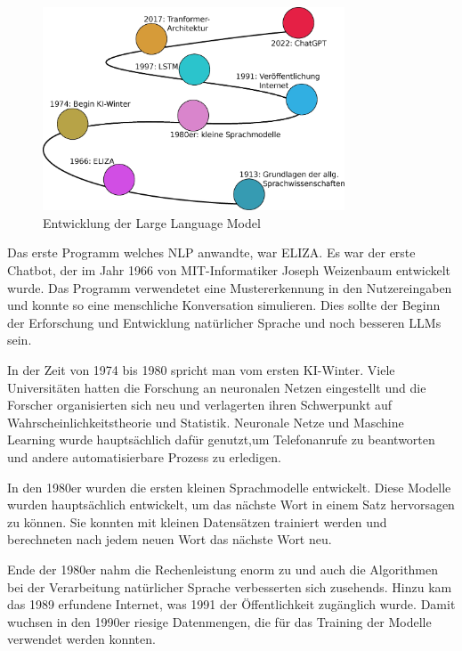 \begin{center}
	\begin{figure}[!ht]
		\includegraphics[width=0.8\textwidth]{content/chapter_basics/images/evolution_of_llm.eps}
		\centering
		\caption{Entwicklung der Large Language Model}
		\label{img:evolotion_of_llm}
	\end{figure}
\end{center}

Das erste Programm welches \acrshort{NLP} anwandte, war ELIZA. Es war der erste Chatbot, der im Jahr 1966 von MIT-Informatiker Joseph Weizenbaum entwickelt wurde. Das Programm verwendetet eine Mustererkennung in den Nutzereingaben und konnte so eine menschliche Konversation simulieren. Dies sollte der Beginn der Erforschung und Entwicklung natürlicher Sprache und noch besseren LLMs sein.\vspace{0.2cm}

In der Zeit von 1974 bis 1980 spricht man vom \glqq ersten KI-Winter\grqq . Viele Universitäten hatten die Forschung an neuronalen Netzen eingestellt und die Forscher organisierten sich neu und verlagerten ihren Schwerpunkt auf Wahrscheinlichkeitstheorie und Statistik. Neuronale Netze und Maschine Learning wurde hauptsächlich dafür genutzt,um Telefonanrufe zu beantworten und andere automatisierbare Prozess zu erledigen.\vspace{0.2cm}

In den 1980er wurden die ersten kleinen Sprachmodelle entwickelt. Diese Modelle wurden hauptsächlich entwickelt, um das nächste Wort in einem Satz hervorsagen zu können. Sie konnten mit kleinen Datensätzen trainiert werden und berechneten nach jedem neuen Wort das nächste Wort neu.\vspace{0.2cm}

Ende der 1980er nahm die Rechenleistung enorm zu und auch die Algorithmen bei der Verarbeitung natürlicher Sprache verbesserten sich zusehends. Hinzu kam das 1989 erfundene Internet, was 1991 der Öffentlichkeit zugänglich wurde. Damit wuchsen in den 1990er riesige Datenmengen, die für das Training der Modelle verwendet werden konnten.\vspace{0.2cm}

